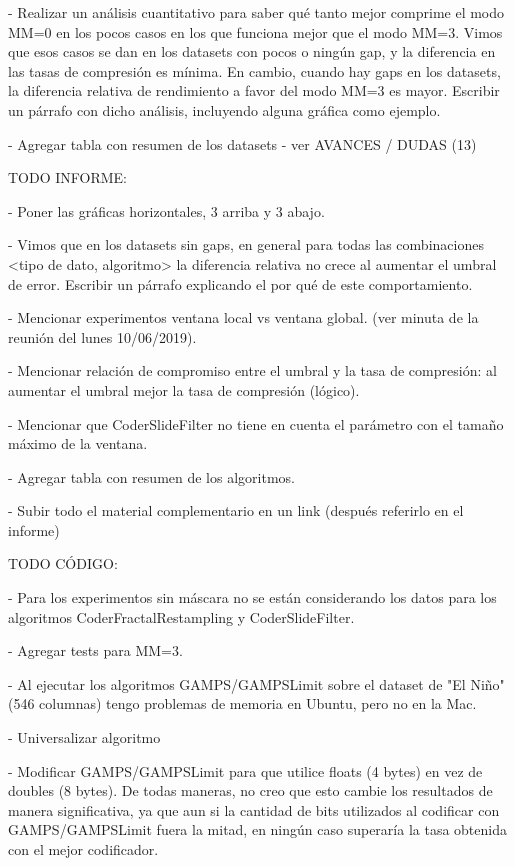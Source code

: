- Realizar un análisis cuantitativo para saber qué tanto mejor comprime el modo MM=0 en los pocos casos en los que funciona mejor que el modo MM=3. Vimos que esos casos se dan en los datasets con pocos o ningún gap, y la diferencia en las tasas de compresión es mínima. En cambio, cuando hay gaps en los datasets, la diferencia relativa de rendimiento a favor del modo MM=3 es mayor. Escribir un párrafo con dicho análisis, incluyendo alguna gráfica como ejemplo.

- Agregar tabla con resumen de los datasets - ver AVANCES / DUDAS (13)

\vspace{+20pt}

TODO INFORME:

- Poner las gráficas horizontales, 3 arriba y 3 abajo.

- Vimos que en los datasets sin gaps, en general para todas las combinaciones <tipo de dato, algoritmo> la diferencia relativa no crece al aumentar el umbral de error. Escribir un párrafo explicando el por qué de este comportamiento.

- Mencionar experimentos ventana local vs ventana global. (ver minuta de la reunión del lunes 10/06/2019).

- Mencionar relación de compromiso entre el umbral y la tasa de compresión: al aumentar el umbral mejor la tasa de compresión (lógico).

- Mencionar que CoderSlideFilter no tiene en cuenta el parámetro con el tamaño máximo de la ventana.

- Agregar tabla con resumen de los algoritmos.

- Subir todo el material complementario en un link (después referirlo en el informe)

\clearpage

TODO CÓDIGO:

- Para los experimentos sin máscara no se están considerando los datos para los algoritmos CoderFractalRestampling y CoderSlideFilter.

- Agregar tests para MM=3.

- Al ejecutar los algoritmos GAMPS/GAMPSLimit sobre el dataset de "El Niño" (546 columnas) tengo problemas de memoria en Ubuntu, pero no en la Mac.

- Universalizar algoritmo

- Modificar GAMPS/GAMPSLimit para que utilice floats (4 bytes) en vez de doubles (8 bytes). De todas maneras, no creo que esto cambie los resultados de manera significativa, ya que aun si la cantidad de bits utilizados al codificar con GAMPS/GAMPSLimit fuera la mitad, en ningún caso superaría la tasa obtenida con el mejor codificador.